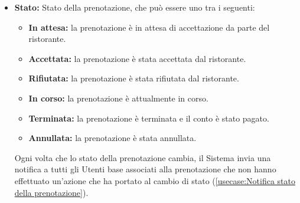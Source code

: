 \begin{itemize}
\begin{itemize}
		      \item \textbf{Stato:} Stato della prenotazione, che può essere uno tra i seguenti:
		            \begin{itemize}
			            \item \textbf{In attesa:} la prenotazione è in attesa di accettazione da parte del ristorante.
						\item \textbf{Accettata:} la prenotazione è stata accettata dal ristorante.
						\item \textbf{Rifiutata:} la prenotazione è stata rifiutata dal ristorante.
						\item \textbf{In corso:} la prenotazione è attualmente in corso.
						\item \textbf{Terminata:} la prenotazione è terminata e il conto è stato pagato.
						\item \textbf{Annullata:} la prenotazione è stata annullata.
		            \end{itemize}

		            Ogni volta che lo stato della prenotazione cambia, il Sistema
		            invia una notifica a tutti gli Utenti base associati alla
		            prenotazione che non hanno effettuato un'azione che ha portato al
		            cambio di stato (\autoref{usecase:Notifica stato della prenotazione}).
	      \end{itemize}

\end{itemize}
